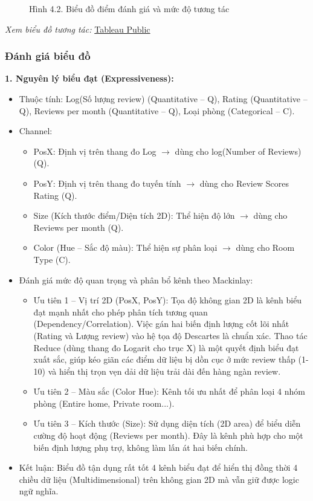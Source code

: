 \begin{figure}[H]
    \centering
    \caption{Hình 4.2. Biểu đồ điểm đánh giá và mức độ tương tác}
    \label{fig:domain-task4-chart2}
\end{figure}

\noindent\small\textit{Xem biểu đồ tương tác: }\href{https://public.tableau.com/app/profile/duy.le4605/viz/Group10_17788537028430/Task4_2-BubbleScatterRatingReviews?publish=yes}{Tableau Public}\normalsize

\subsubsection{Đánh giá biểu đồ}

\textbf{1. Nguyên lý biểu đạt (Expressiveness):}

\begin{itemize}
    \item Thuộc tính: Log(Số lượng review) (Quantitative -- Q), Rating (Quantitative -- Q), Reviews per month (Quantitative -- Q), Loại phòng (Categorical -- C).
    \item Channel:
    \begin{itemize}
        \item PosX: Định vị trên thang đo Log $\rightarrow$ dùng cho log(Number of Reviews) (Q).
        \item PosY: Định vị trên thang đo tuyến tính $\rightarrow$ dùng cho Review Scores Rating (Q).
        \item Size (Kích thước điểm/Diện tích 2D): Thể hiện độ lớn $\rightarrow$ dùng cho Reviews per month (Q).
        \item Color (Hue -- Sắc độ màu): Thể hiện sự phân loại $\rightarrow$ dùng cho Room Type (C).
    \end{itemize}
    \item Đánh giá mức độ quan trọng và phân bổ kênh theo Mackinlay:
    \begin{itemize}
        \item Ưu tiên 1 -- Vị trí 2D (PosX, PosY): Tọa độ không gian 2D là kênh biểu đạt mạnh nhất cho phép phân tích tương quan (Dependency/Correlation). Việc gán hai biến định lượng cốt lõi nhất (Rating và Lượng review) vào hệ tọa độ Descartes là chuẩn xác. Thao tác Reduce (dùng thang đo Logarit cho trục X) là một quyết định biểu đạt xuất sắc, giúp kéo giãn các điểm dữ liệu bị dồn cục ở mức review thấp (1-10) và hiển thị trọn vẹn dải dữ liệu trải dài đến hàng ngàn review.
        \item Ưu tiên 2 -- Màu sắc (Color Hue): Kênh tối ưu nhất để phân loại 4 nhóm phòng (Entire home, Private room...).
        \item Ưu tiên 3 -- Kích thước (Size): Sử dụng diện tích (2D area) để biểu diễn cường độ hoạt động (Reviews per month). Đây là kênh phù hợp cho một biến định lượng phụ trợ, không làm lấn át hai biến chính.
    \end{itemize}
    \item Kết luận: Biểu đồ tận dụng rất tốt 4 kênh biểu đạt để hiển thị đồng thời 4 chiều dữ liệu (Multidimensional) trên không gian 2D mà vẫn giữ được logic ngữ nghĩa.
\end{itemize}

